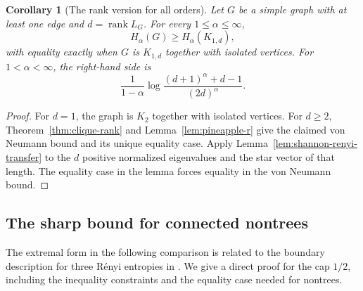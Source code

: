 \documentclass[11pt,a4paper,reqno]{amsart}
\newtheorem{corollary}[theorem]{Corollary}
\theoremstyle{remark}
\numberwithin{equation}{section}
\begin{document}
\begin{corollary}[The rank version for all orders]
\label{cor:renyi-rank}
Let $G$ be a simple graph with at least one edge and
$d=\operatorname{rank}L_G$. For every $1\le\alpha\le\infty$,
\[
 H_\alpha(G)\ge H_\alpha(K_{1,d}),
\]
with equality exactly when $G$ is $K_{1,d}$ together with isolated vertices.
For $1<\alpha<\infty$, the right-hand side is
\[
 \frac1{1-\alpha}\log\frac{(d+1)^\alpha+d-1}{(2d)^\alpha}.
\]
\end{corollary}
\begin{proof}
For $d=1$, the graph is $K_2$ together with isolated vertices.
For $d\ge2$, Theorem~\ref{thm:clique-rank} and
Lemma~\ref{lem:pineapple-r} give the claimed von Neumann bound and its
unique equality case. Apply Lemma~\ref{lem:shannon-renyi-transfer} to
the $d$ positive normalized eigenvalues and the star vector of that length.
The equality case in the lemma forces equality in the von Neumann bound.
\end{proof}

\subsection{The sharp bound for connected nontrees}

The extremal form in the following comparison is related to the
boundary description for three R\'enyi entropies in
\cite[Section 4]{Harremoes2009}. We give a direct proof for the cap
$1/2$, including the inequality constraints and the equality case
needed for nontrees.
\end{document}
